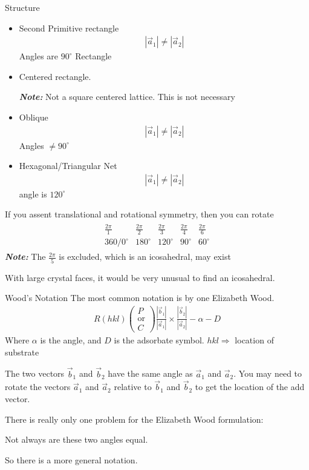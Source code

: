 \documentclass{article}
\newcommand{\note}[1]{\vspace{3\parsep}\textit{\textbf{Note: }}#1\vspace{2\parsep}}
\newcommand{\norm}[1]{\left|#1\right|}
\newcommand{\aone}[0]{\vec{a}_1}
\newcommand{\atwo}[0]{\vec{a}_2}
\newcommand{\bone}[0]{\vec{b}_1}
\newcommand{\btwo}[0]{\vec{b}_2}
\newcommand{\pmat}[1]{\begin{pmatrix}#1\end{pmatrix}}
\begin{document}
\begin{section}{Structure}
\begin{enumerate}
\begin{itemize}
				\item Second Primitive rectangle
					\begin{align*}
						\norm{\aone} \neq\norm{\atwo}
					\end{align*}
					Angles are $90^\circ$
					Rectangle

				\item Centered rectangle.

					\note{Not a square centered lattice. This is not necessary}


				\item Oblique
					\begin{align*}
						\norm{\aone}\neq\norm{\atwo}
					\end{align*}
					Angles $\neq 90^\circ$

				\item Hexagonal/Triangular Net
					\begin{align*}
						\norm{\aone}\neq\norm{\atwo}
					\end{align*}
					angle is $120^\circ$
			\end{itemize}
	\end{enumerate}

	If you assent translational and rotational symmetry, then you can rotate 
	\begin{align*}
		\begin{matrix}\frac{2\pi}{1} & \frac{2\pi}{2} & \frac{2\pi}{3} & \frac{2\pi}{4} & \frac{2\pi}{6}\\
			360/0^\circ & 180^\circ & 120^\circ & 90^\circ & 60^\circ\end{matrix}
	\end{align*}
	\note{The $\frac{2\pi}{5}$ is excluded, which is an icosahedral, may exist}


	With large crystal faces, it would be very unusual to find an icosahedral.


\end{section}
\begin{section}{Wood's Notation}
	The most common notation is by one Elizabeth Wood.
	\begin{align*}
		R(hkl)\pmat{P\\\text{or}\\ C}\frac{\norm{\bone}}{\norm{\aone}}\times \frac{\norm{\btwo}}{\norm{\atwo}} - \alpha - D
	\end{align*}
Where $\alpha$ is the angle, and $D$ is the adsorbate symbol.
	$hkl\Rightarrow$ location of substrate

	The two vectors $\bone$ and $\btwo$ have the same angle as $\aone$ and $\atwo$. You may need to rotate the vectors $\aone$ and $\atwo$ relative to $\bone$ and $\btwo$ to get the location of the add vector.

	There is really only one problem for the Elizabeth Wood formulation:

	Not always are these two angles equal.  

	So there is a more general notation.
\end{section}
\end{document}
